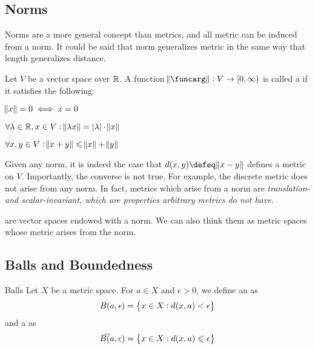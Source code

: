 \documentclass{styles/tufte}
\begin{document}
\subsection{Norms}
  
  Norms are a more general concept than metrics, and all metric can be induced from a norm. It could be said that norm generalizes metric in the same way that length generalizes distance.
  
  \begin{definition}{}{}
    Let $V$ be a vector space over $\mathbb{R}$. A function $\norm{\funcarg}: V \to [0, \infty)$ is called a  if it satisfies the following:
    \begin{romanenum}
      \item $\norm{x} = 0 \iff x = 0$
      \item $\forall \lambda \in \RR, x \in V: \norm{\lambda x} = \abs{\lambda} \cdot \norm{x}$
      \item $\forall x, y \in V: \norm{x + y} \leqslant \norm{x} + \norm{y}$
    \end{romanenum}
  \end{definition}
  
  Given any norm, it is indeed the case that $d(x, y) \defeq \norm{x - y}$ defines a metric on $V$. Importantly, the converse is not true. For example, the discrete metric does not arise from any norm. In fact, metrics which arise from a norm are \em{translation- and scalar-invariant}, which are properties arbitrary metrics do not have.
  
   are vector spaces endowed with a norm. We can also think them as metric spaces whose metric arises from the norm.


\subsection{Balls and Boundedness}
  
  \begin{definition}{Balls}{}
    Let $X$ be a metric space. For $a \in X$ and $\epsilon > 0$, we define an  as
    \[ B(a, \epsilon) = \set{x \in X: d(x, a) < \epsilon} \]
    and a  as
    \[ \overline{B}(a, \epsilon) = \set{x \in X: d(x, a) \leqslant \epsilon} \]
  \end{definition}
\end{document}
